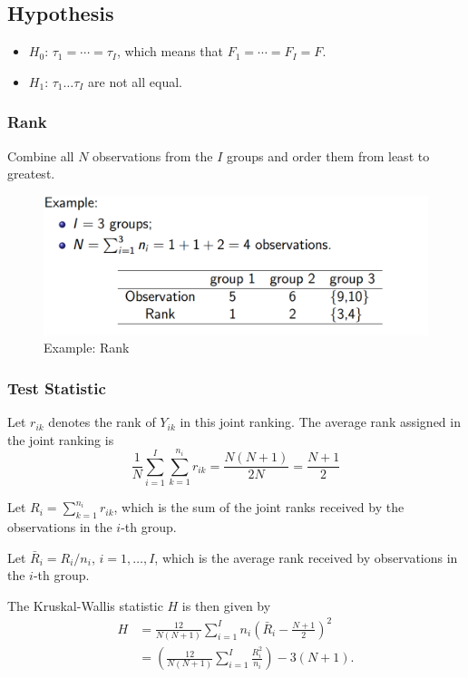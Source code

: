 \subsection{Hypothesis}
\begin{itemize}
	\item $H_0$: $\tau_1 = \cdots = \tau_I$, which means that $F_1 = \cdots = F_I = F$.
	\item $H_1$: $\tau_1 \dots \tau_I$ are not all equal.
\end{itemize}
\subsubsection{Rank}
Combine all $N$ observations from the $I$ groups and order them from least to greatest.
\begin{figure}[H]
	\centering
	\includegraphics[width=0.7\linewidth]{fig/rank}
	\caption{Example: Rank}
	\label{fig:rank}
\end{figure}

\subsubsection{Test Statistic}

Let $r_{ik}$ denotes the rank of $Y_{ik}$ in this joint ranking. The average rank assigned in the joint ranking is 
\[\frac{1}{N}\sum_{i = 1}^{I} \sum_{k=1}^{n_i} r_{ik} = \frac{N(N+1)}{2N} = \frac{N + 1}{2}\]

Let $R_i = \sum_{k=1}^{n_i} r_{ik}$, which is the sum of the joint ranks received by the observations in the $i$-th group.

Let $\bar{R}_i = R_i / n_i$, $i = 1, \dots, I$, which is the average rank received by observations in the $i$-th group.

The Kruskal-Wallis statistic $H$ is then given by
\begin{align*}
	H 
	&= \frac{12}{N(N+1)} \sum_{i=1}^{I} n_i (\bar{R}_i - \frac{N+1}{2})^2\\
	&= (\frac{12}{N(N+1)} \sum_{i=1}^{I} \frac{R_i^2}{n_i}) - 3(N+1).
\end{align*}

